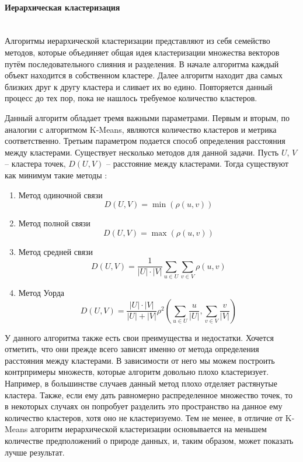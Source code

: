 \paragraph{Иерархическая кластеризация}\mbox{} \\

Алгоритмы иерархической кластеризации представляют из себя семейство методов, которые объединяет общая идея кластеризации множества векторов путём последовательного слияния и разделения. В начале алгоритма каждый объект находится в собственном кластере. Далее алгоритм находит два самых близких друг к другу кластера и сливает их во едино. Повторяется данный процесс до тех пор, пока не нашлось требуемое количество кластеров.

Данный алгоритм обладает тремя важными параметрами. Первым и вторым, по аналогии с алгоритмом K-Means, являются количество кластеров и метрика соответственно. Третьим параметром подается способ определения расстояния между кластерами. Существует несколько методов для данной задачи. Пусть $U$, $V$ -- кластера точек, $D(U, V)$ -- расстояние между кластерами. Тогда существуют как минимум такие методы \cite{hierarchical}:

\begin{enumerate}
    \item Метод одиночной связи $$D(U, V) = \min(\rho(u, v))$$
    \item Метод полной связи $$D(U, V) = \max(\rho(u, v))$$
    \item Метод средней связи $$D(U, V) = \frac{1}{|U| \cdot |V|}\sum_{u \in U} \sum_{v \in V} \rho(u, v)$$
    \item Метод Уорда $$D(U, V) = \frac{|U| \cdot |V|}{|U| + |V|} \rho^2 \left( \sum_{u \in U} \frac{u}{|U|}, \sum_{v \in V} \frac{v}{|V|} \right)$$
\end{enumerate}

У данного алгоритма также есть свои преимущества и недостатки. Хочется отметить, что они прежде всего зависят именно от метода определения расстояния между кластерами. В зависимости от него мы можем построить контрпримеры множеств, которые алгоритм довольно плохо кластеризует. Например, в большинстве случаев данный метод плохо отделяет растянутые кластера.
Также, если ему дать равномерно распределенное множество точек, то в некоторых случаях он попробует разделить это пространство на данное ему количество кластеров, хотя оно не кластеризуемо. Тем не менее, в отличие от K-Means алгоритм иерархической кластеризации основывается на меньшем количестве предположений о природе данных, и, таким образом, может показать лучше результат.

